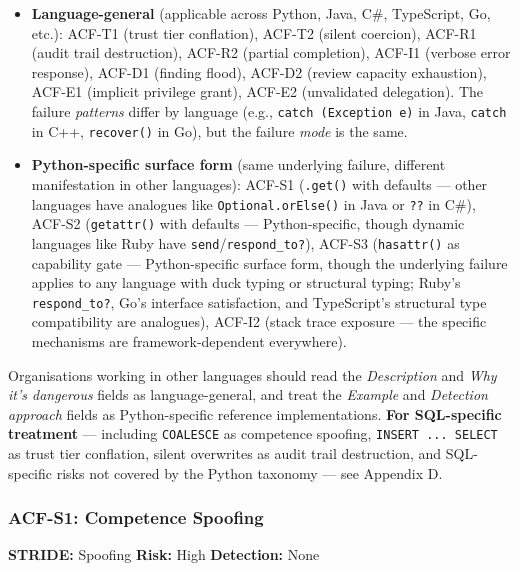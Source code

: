 \documentclass[a4paper,11pt]{report}
\providecommand{\tightlist}{%
  \setlength{\itemsep}{0pt}\setlength{\parskip}{0pt}}
\begin{document}
\begin{itemize}
\tightlist
\item
  \textbf{Language-general} (applicable across Python, Java, C\#,
  TypeScript, Go, etc.): ACF-T1 (trust tier conflation), ACF-T2 (silent
  coercion), ACF-R1 (audit trail destruction), ACF-R2 (partial
  completion), ACF-I1 (verbose error response), ACF-D1 (finding flood),
  ACF-D2 (review capacity exhaustion), ACF-E1 (implicit privilege
  grant), ACF-E2 (unvalidated delegation). The failure \emph{patterns}
  differ by language (e.g., \texttt{catch\ (Exception\ e)} in Java,
  \texttt{catch} in C++, \texttt{recover()} in Go), but the failure
  \emph{mode} is the same.
\item
  \textbf{Python-specific surface form} (same underlying failure,
  different manifestation in other languages): ACF-S1 (\texttt{.get()}
  with defaults --- other languages have analogues like
  \texttt{Optional.orElse()} in Java or \texttt{??} in C\#), ACF-S2
  (\texttt{getattr()} with defaults --- Python-specific, though dynamic
  languages like Ruby have \texttt{send}/\texttt{respond\_to?}), ACF-S3
  (\texttt{hasattr()} as capability gate --- Python-specific surface
  form, though the underlying failure applies to any language with duck
  typing or structural typing; Ruby's \texttt{respond\_to?}, Go's
  interface satisfaction, and TypeScript's structural type compatibility
  are analogues), ACF-I2 (stack trace exposure --- the specific
  mechanisms are framework-dependent everywhere).
\end{itemize}

Organisations working in other languages should read the
\emph{Description} and \emph{Why it's dangerous} fields as
language-general, and treat the \emph{Example} and \emph{Detection
approach} fields as Python-specific reference implementations.
\textbf{For SQL-specific treatment} --- including \texttt{COALESCE} as
competence spoofing, \texttt{INSERT\ ...\ SELECT} as trust tier
conflation, silent overwrites as audit trail destruction, and
SQL-specific risks not covered by the Python taxonomy --- see Appendix
D.

\hypertarget{acf-s1-competence-spoofing}{%
\subsubsection{ACF-S1: Competence
Spoofing}\label{acf-s1-competence-spoofing}}

\textbf{STRIDE:} Spoofing \textbar{} \textbf{Risk:} High \textbar{}
\textbf{Detection:} None
\end{document}

